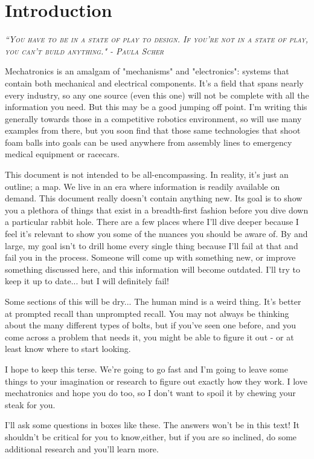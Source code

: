 
\chapter{Introduction}
 
 {\slshape \scshape ``You have to be in a state of play to design. If you're not in a state of play, you can't build anything." - Paula Scher}

Mechatronics is an amalgam of "mechanisms" and "electronics": systems that contain both mechanical and electrical components. It's a field that spans nearly every industry, so any one source (even this one) will not be complete with all the information you need. But this may be a good jumping off point. I'm writing this generally towards those in a competitive robotics environment, so will use many examples from there, but you soon find that those same technologies that shoot foam balls into goals can be used anywhere from assembly lines to emergency medical equipment or racecars.

This document is not intended to be all-encompassing. In reality, it's just an outline; a map. We live in an era where information is readily available on demand. This document really doesn't contain anything new. Its goal is to show you a plethora of things that exist in a breadth-first fashion before you dive down a particular rabbit hole. There are a few places where I'll dive deeper because I feel it's relevant to show you some of the nuances you should be aware of. By and large, my goal isn't to drill home every single thing because I'll fail at that and fail you in the process. Someone will come up with something new, or improve something discussed here, and this information will become outdated. I'll try to keep it up to date... but I will definitely fail!

Some sections of this will be dry... The human mind is a weird thing. It's better at prompted recall than unprompted recall. You may not always be thinking about the many different types of bolts, but if you've seen one before, and you come across a problem that needs it, you might be able to figure it out - or at least know where to start looking.

I hope to keep this terse. We're going to go fast and I'm going to leave some things to your imagination or research to figure out exactly how they work. I love mechatronics and hope you do too, so I don't want to spoil it by chewing your steak for you.

\begin{mdframed}[style=QuestionBox]
	I'll ask some questions in boxes like these. The answers won't be in this text! It shouldn't be critical for you to know,either, but if you are so inclined, do some additional research and you'll learn more.
\end{mdframed}

